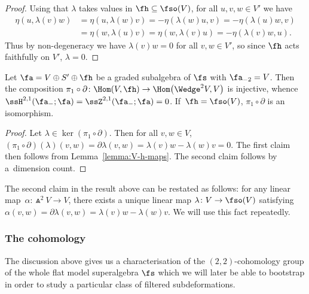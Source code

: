 \begin{proof}
	Using that $\lambda$ takes values in $\fh\subseteq \fso(V)$, for all $u,v,w\in V'$ we have
	\begin{align*}
		\eta(u,\lambda(v)w)
		&= \eta(u,\lambda(w)v)
		= -\eta(\lambda(w)u,v)
		= -\eta(\lambda(u)w,v) \\
		&
		= \eta(w,\lambda(u)v)
		= \eta(w,\lambda(v)u)
		= -\eta(\lambda(v)w,u).
	\end{align*}
	Thus by non-degeneracy we have $\lambda(v)w=0$ for all $v,w\in V'$, so since $\fh$ acts faithfully on $V'$, $\lambda=0$.
\end{proof}

\begin{Corollary}\label{coro:21-22-injective}
	Let $\fa=V\oplus S'\oplus \fh$ be a graded subalgebra of $\fs$ with $\fa_{-2}=V$. Then the composition
$\pi_1\circ\partial\colon \Hom(V,\fh) \to \Hom\bigl(\Wedge^2 V,V\bigr)
$
	is injective, whence ${\ssH^{2,1}(\fa_-;\fa)=\ssZ^{2,1}(\fa_-;\fa)=0}$. If~${\fh=\fso(V)}$, $\pi_1\circ\partial$ is an isomorphism.
\end{Corollary}
\begin{proof}
Let $\lambda\in\ker(\pi_1\circ\partial)$. Then for all $v,w\in V$,
$(\pi_1\circ\partial)(\lambda)(v,w) = \partial\lambda(v,w) = \lambda(v)w - \lambda(w)v = 0$.
The first claim then follows from Lemma~\ref{lemma:V-h-maps}. The second claim follows by a~dimension count.
\end{proof}

\begin{Remark}
	The second claim in the result above can be restated as follows: for any linear map~${\alpha\colon\Wedge^2 V\to V}$, there exists a unique linear map $\lambda\colon V\to\fso(V)$ satisfying $\alpha(v,w)=\partial\lambda(v,w) = \lambda(v)w-\lambda(w)v$. We will use this fact repeatedly.
\end{Remark}

\subsubsection{The cohomology}

The discussion above gives us a characterisation of the $(2,2)$-cohomology group of the whole flat model superalgebra $\fs$ which we will later be able to bootstrap in order to study a particular class of filtered subdeformations.

